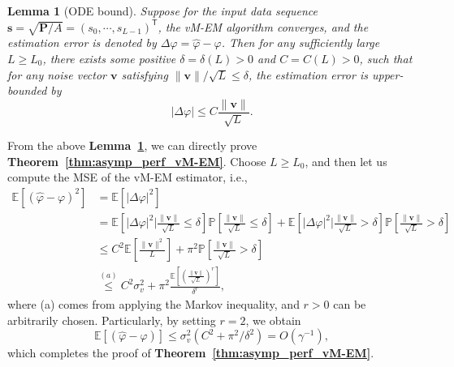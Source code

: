 \documentclass[a4paper,12pt]{article}
\newtheorem{lemma}{\bf Lemma}
\def \T {^{\mathsf{T}}}
\begin{document}
\begin{lemma}[ODE bound] \label{lemma:ODE-bound}
    Suppose for the input data sequence ${\bm s} = \sqrt{{\bm P}/A} = (s_0, \cdots, s_{L-1})\T$, the vM-EM algorithm converges, and the estimation error is denoted by $\Delta\varphi = \hat{\varphi} - \varphi$. Then for any sufficiently large $L\geq L_0$, there exists some positive $\delta = \delta(L)>0$ and $C=C(L)>0$, such that for any noise vector ${\bm v}$ satisfying $\|{\bm v}\|/\sqrt{L} \leq \delta$, the estimation error is upper-bounded by
    \begin{equation}
        |\Delta\varphi|\leq C \frac{\|{\bm v}\|}{\sqrt{L}}. 
    \end{equation}
\end{lemma}
From the above {\bf Lemma~\ref{lemma:ODE-bound}}, we can directly prove {\bf Theorem~\ref{thm:asymp_perf_vM-EM}}. Choose $L\geq L_0$, and then let us compute the MSE of the vM-EM estimator, i.e., 
\begin{equation}
    \begin{aligned}
    \mathbb{E}[(\hat{\varphi}-\varphi)^2] &= \mathbb{E}[|\Delta\varphi|^2] \\
    &= \mathbb{E}\left[|\Delta\varphi|^2 \Bigg|\frac{\|{\bm v}\|}{\sqrt{L}} \leq \delta \right]\mathbb{P}\left[\frac{\|{\bm v}\|}{\sqrt{L}} \leq \delta \right] + \mathbb{E}\left[|\Delta\varphi|^2 \Bigg|\frac{\|{\bm v}\|}{\sqrt{L}} > \delta \right]\mathbb{P}\left[\frac{\|{\bm v}\|}{\sqrt{L}}>\delta \right] \\
    & \leq C^2 \mathbb{E}\left[\frac{\|{\bm v}\|^2}{L}\right] + \pi^2 \mathbb{P}\left[\frac{\|{\bm v}\|}{\sqrt{L}}>\delta\right] \\
    & \overset{(a)}{\leq} C^2\sigma_v^2 + \pi^2 \frac{\mathbb{E}\left[\left(\frac{\|{\bm v}\|}{\sqrt{L}}\right)^r\right]}{\delta^r},
    \end{aligned}
\end{equation}
where (a) comes from applying the Markov inequality, and $r>0$ can be arbitrarily chosen. Particularly, by setting $r=2$, we obtain 
\begin{equation}
    \mathbb{E}\left[(\hat{\varphi} - \varphi)\right] \leq \sigma_v^2(C^2+\pi^2/\delta^2) = O(\gamma^{-1}),  
\end{equation}
which completes the proof of {\bf Theorem~\ref{thm:asymp_perf_vM-EM}}. 
\end{document}
